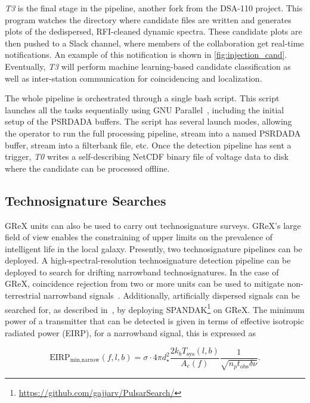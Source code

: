 \textit{T3} is the final stage in the pipeline, another fork from the DSA-110 project.
This program watches the directory where candidate files are written and generates plots of the dedispersed, RFI-cleaned dynamic spectra.
These candidate plots are then pushed to a Slack channel, where members of the collaboration get real-time notifications.
An example of this notification is shown in \autoref{fig:injection_cand}.
Eventually, \textit{T3} will perform machine learning-based candidate classification as well as inter-station communication for coincidencing and localization.

The whole pipeline is orchestrated through a single bash script.
This script launches all the tasks sequentially using GNU Parallel~\cite{tange_2025_14911163}, including the initial setup of the PSRDADA buffers.
The script has several launch modes, allowing the operator to run the full processing pipeline, stream into a named PSRDADA buffer, stream into a filterbank file, etc.
Once the detection pipeline has sent a trigger, \textit{T0} writes a self-describing NetCDF binary file of voltage data to disk where the candidate can be processed offline.

\subsection{Technosignature Searches}

GReX units can also be used to carry out technosignature surveys.
GReX's large field of view enables the constraining of upper limits on the prevalence of intelligent life in the local galaxy.
Presently, two technosignature pipelines can be deployed. 
A high-spectral-resolution technosignature detection pipeline can be deployed to search for drifting narrowband technosignatures.
In the case of GReX, coincidence rejection from two or more units can be used to mitigate non-terrestrial narrowband signals~\cite{johnsonSimultaneousDualsiteTechnosignature2023}.
Additionally, artificially dispersed signals can be searched for, as described in~\cite{gajjarSearchingBroadbandPulsed2022}, by deploying \textsc{SPANDAK}\footnote{\url{https://github.com/gajjarv/PulsarSearch/}} on GReX.
The minimum power of a transmitter that can be detected is given in terms of effective isotropic radiated power (EIRP), for a narrowband signal, this is expressed as


\begin{equation}
    \text{EIRP}_\text{min,narrow}(f, l, b) = \sigma \cdot 4\pi d_\star^2  \frac{2 k_b T_{\text{sys}}(l, b)}{A_e(f)}  \frac{1}{\sqrt{n_p  t_\text{obs}  \delta\nu}}.
\end{equation}

